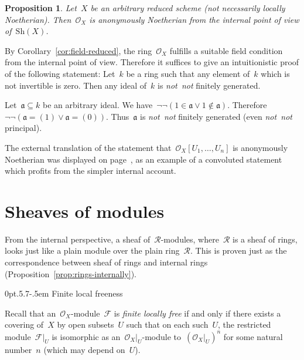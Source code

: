 \documentclass[10pt,reqno,a4paper]{amsbook}
\makeatletter
\theoremstyle{definition}
\theoremstyle{plain}
\newtheorem{prop}[defn]{Proposition}
\theoremstyle{remark}
\newcommand{\F}{\mathcal{F}}
\renewcommand{\O}{\mathcal{O}}
\newcommand{\R}{\mathcal{R}}
\newcommand{\aaa}{\mathfrak{a}}
\newcommand{\Sh}{\mathrm{Sh}}
\newcommand{\?}{\,{:}\,}
\renewcommand{\_}{\mathpunct{.}\,}
\newcommand{\notnot}{\emph{not~not}\xspace}
\renewenvironment{proof}[1][\proofname]{\par
  \pushQED{\qed}%
  \normalfont \topsep6\p@\@plus6\p@\relax
  \trivlist
  \item[\hskip\labelsep
        \itshape
    #1\@addpunct{.}]\ignorespaces
}{%
  \popQED\endtrivlist\@endpefalse
}
\def\subsection{\@startsection{subsection}{2}%
  {0pt}{.5\linespacing\@plus.7\linespacing}{-.5em}%
  {\normalfont\bfseries}}
\makeatother
\begin{document}
{\begin{prop}\label{prop:ox-anonymously-noetherian}
Let~$X$ be an arbitrary reduced scheme (not necessarily locally
Noetherian). Then~$\O_X$ is anonymously Noetherian from the internal point of view
of~$\Sh(X)$.\end{prop}
\begin{proof}By Corollary~\ref{cor:field-reduced}, the ring~$\O_X$ fulfills a
suitable field condition from the internal point of view. Therefore it suffices
to give an intuitionistic proof of the following statement: Let~$k$ be a ring such that
any element of~$k$ which is not invertible is zero. Then any ideal of~$k$ is
\notnot finitely generated.

Let~$\aaa \subseteq k$ be an arbitrary ideal. We have~$\neg\neg(1 \in \aaa \vee
1 \not\in \aaa)$. Therefore~$\neg\neg(\aaa = (1) \vee \aaa = (0))$. Thus~$\aaa$
is \notnot finitely generated (even \notnot principal).
\end{proof}

The external translation of the statement
that~$\O_X[U_1,\ldots,U_n]$ is anonymously Noetherian was displayed on
page~\pageref{page:convoluted-statement}, as an example of a convoluted
statement which profits from the simpler internal account.

}


\section{Sheaves of modules}
\label{sect:sheaves-of-modules}

From the internal perspective, a sheaf of~$\R$-modules, where~$\R$ is a sheaf
of rings, looks just like a plain module over the plain ring~$\R$. This is
proven just as the correspondence between sheaf of rings and internal rings
(Proposition~\ref{prop:rings-internally}).


\subsection{Finite local freeness}

Recall that an~$\O_X$-module~$\F$ is \emph{finite locally free} if and only
if there exists a covering of~$X$ by open subsets~$U$ such that on each
such~$U$, the restricted module~$\F|_U$ is isomorphic as an~$\O_X|_U$-module
to~$(\O_X|_U)^n$ for some natural number~$n$ (which may depend on~$U$).
\end{document}
